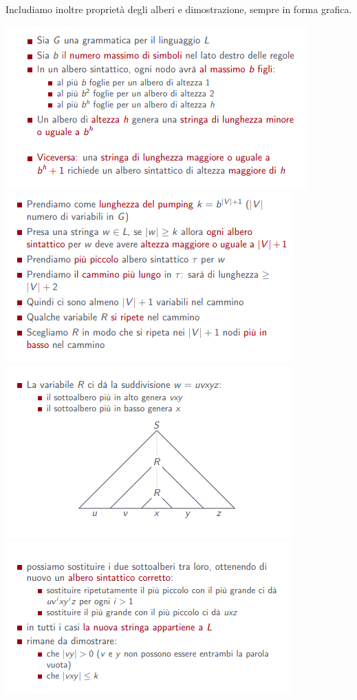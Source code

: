 \documentclass[]{article}
\begin{document}
			Includiamo inoltre proprietà degli alberi e dimostrazione, sempre in forma grafica.
			\begin{center}
				\includegraphics{PLCFG4.png}
				\includegraphics{PLCFG5.png}
				\includegraphics{PLCFG6.png}
				\includegraphics{PLCFG7.png}

\end{center}
\end{document}

